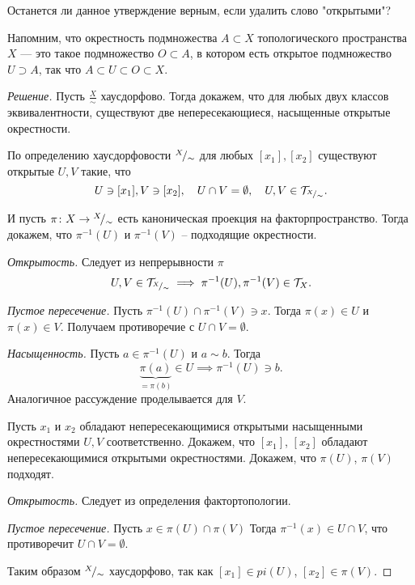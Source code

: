 \documentclass[10pt]{article}
\begin{document}
\begin{tasks}
	Останется ли данное утверждение верным, если удалить слово "открытыми"?
	
	Напомним, что окрестность подмножества $A\subset X$ топологического пространства $X$ — это такое подмножество $O\subset A$, в котором есть открытое подмножество $U\supset A$, так что $A\subset U\subset O \subset X$.
	
	\begin{proof}[Решение]
		\fbox{$\implies$} \hspace{1ex} Пусть $\frac X \sim$ хаусдорфово. Тогда докажем, что для любых двух классов эквивалентности, существуют две непересекающиеся, насыщенные открытые окрестности.
		
		По определению хаусдорфовости ${}^{X}\!/_{\sim}$ для любых $[x_1], [x_2]$ существуют открытые $U, V$ такие, что \[U \ni [x_1], V \ni [x_2], \quad U \cap V = \emptyset, \quad U, V \in \mathcal T_{{}^{X}\!/_{\sim}}.\]
		
		И пусть $\pi\colon X \to {}^{X}\!/_{\sim}$ есть каноническая проекция на факторпространство. Тогда докажем, что $\pi^{-1}(U)$ и $\pi^{-1}(V)$ -- подходящие окрестности. 
		\begin{conditions}
			\item \textit{Открытость.} Следует из непрерывности $\pi$  \[U, V \in \mathcal T_{{}^{X}\!/_{\sim}} \implies \pi^{-1}(U), \pi^{-1}(V) \in \mathcal T_X.\]
			\item \textit{Пустое пересечение.} Пусть $\pi^{-1}(U)\cap \pi^{-1}(V) \ni x$. Тогда $\pi(x) \in U$ и $\pi(x) \in V$. Получаем противоречие с $U \cap V = \emptyset$.
			\item \textit{Насыщенность.} Пусть $a \in \pi^{-1}(U)$ и $a \sim b$. Тогда \[\underbrace{\pi(a)}_{=\pi(b)} \in U \implies \pi^{-1}(U) \ni b.\] Аналогичное рассуждение проделывается для $V$.
		\end{conditions} 
		
		\fbox{$\impliedby$} Пусть $x_1$ и $x_2$ обладают непересекающимися открытыми насыщенными окрестностями $U, V$ соответственно. Докажем, что $[x_1]$, $[x_2]$ обладают непересекающимися открытыми окрестностями. 
		Докажем, что $\pi(U)$, $\pi(V)$ подходят.
		\begin{conditions}
			\item \textit{Открытость.} Следует из определения фактортопологии. 
			\item \textit{Пустое пересечение.} Пусть $x \in \pi(U)\cap \pi(V)$ Тогда $\pi^{-1}(x) \in U \cap V$, что противоречит $U \cap V = \emptyset.$ 
		\end{conditions}
		Таким образом ${}^{X}\!/_{\sim}$ хаусдорфово, так как $[x_1] \in pi(U)$, $[x_2] \in \pi(V).$ 
		

\end{proof}
\end{tasks}
\end{document}
